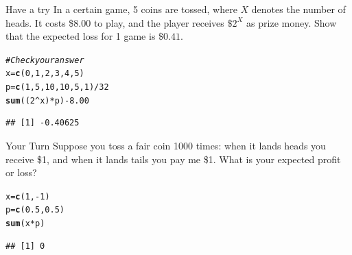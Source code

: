 \documentclass[t,xcolor=pdftex,dvipsnames,table]{beamer}\usepackage[]{graphicx}\usepackage[]{color}
\makeatletter
\newcommand{\hlnum}[1]{\textcolor[rgb]{0.686,0.059,0.569}{#1}}%
\newcommand{\hlcom}[1]{\textcolor[rgb]{0.678,0.584,0.686}{\textit{#1}}}%
\newcommand{\hlopt}[1]{\textcolor[rgb]{0,0,0}{#1}}%
\newcommand{\hlstd}[1]{\textcolor[rgb]{0.345,0.345,0.345}{#1}}%
\newcommand{\hlkwb}[1]{\textcolor[rgb]{0.69,0.353,0.396}{#1}}%
\newcommand{\hlkwd}[1]{\textcolor[rgb]{0.737,0.353,0.396}{\textbf{#1}}}%
\newenvironment{kframe}{%
 \def\at@end@of@kframe{}%
 \ifinner\ifhmode%
  \def\at@end@of@kframe{\end{minipage}}%
  \begin{minipage}{\columnwidth}%
 \fi\fi%
 \def\FrameCommand##1{\hskip\@totalleftmargin \hskip-\fboxsep
 \colorbox{shadecolor}{##1}\hskip-\fboxsep
     \hskip-\linewidth \hskip-\@totalleftmargin \hskip\columnwidth}%
 \MakeFramed {\advance\hsize-\width
   \@totalleftmargin\z@ \linewidth\hsize
   \@setminipage}}%
 {\par\unskip\endMakeFramed%
 \at@end@of@kframe}
\newenvironment{knitrout}{}{} %
\makeatother
\begin{document}
\begin{frame}[fragile]\frametitle{}
\begin{alertblock}{Have a try}
In a certain game, 5 coins are tossed, where $X$ denotes the number of heads. It costs \$8.00 to play, and the player receives $\$ 2^X$ as prize money. Show that the expected loss for 1 game is $\$ 0.41$.
\end{alertblock}

\begin{knitrout}
\color{fgcolor}\begin{kframe}
\begin{alltt}
\hlcom{#Check your answer}
\hlstd{x}\hlkwb{=}\hlkwd{c}\hlstd{(}\hlnum{0}\hlstd{,}\hlnum{1}\hlstd{,}\hlnum{2}\hlstd{,}\hlnum{3}\hlstd{,}\hlnum{4}\hlstd{,}\hlnum{5}\hlstd{)}
\hlstd{p}\hlkwb{=}\hlkwd{c}\hlstd{(}\hlnum{1}\hlstd{,}\hlnum{5}\hlstd{,}\hlnum{10}\hlstd{,}\hlnum{10}\hlstd{,}\hlnum{5}\hlstd{,}\hlnum{1}\hlstd{)}\hlopt{/}\hlnum{32}
\hlkwd{sum}\hlstd{((}\hlnum{2}\hlopt{^}\hlstd{x)}\hlopt{*}\hlstd{p)}\hlopt{-}\hlnum{8.00}
\end{alltt}
\begin{verbatim}
## [1] -0.40625
\end{verbatim}
\end{kframe}
\end{knitrout}
\end{frame}


\begin{frame}[fragile]{}
\begin{alertblock}{Your Turn}
Suppose you toss a fair coin 1000 times:  when it lands heads
you receive \$1, and when it lands tails you pay me \$1.
What is your expected profit or loss?
\end{alertblock}


\begin{knitrout}
\color{fgcolor}\begin{kframe}
\begin{alltt}
\hlstd{x}\hlkwb{=}\hlkwd{c}\hlstd{(}\hlnum{1}\hlstd{,}\hlopt{-}\hlnum{1}\hlstd{)}
\hlstd{p}\hlkwb{=}\hlkwd{c}\hlstd{(}\hlnum{0.5}\hlstd{,}\hlnum{0.5}\hlstd{)}
\hlkwd{sum}\hlstd{(x}\hlopt{*}\hlstd{p)}
\end{alltt}
\begin{verbatim}
## [1] 0
\end{verbatim}
\end{kframe}
\end{knitrout}
\end{frame}
\end{document}
